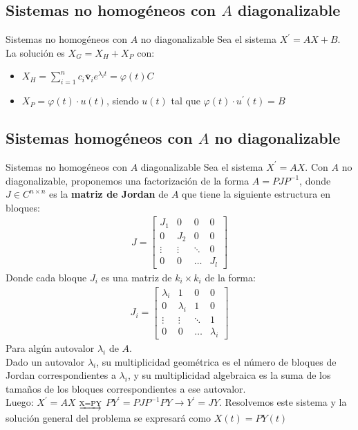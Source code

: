 \documentclass[a4paper, twoside]{article}
\numberwithin{equation}{section}
\numberwithin{figure}{section}
\numberwithin{table}{section}
\newcommand{\vect}[1]{\overline{\textbf{#1}}}
\begin{document}
\subsection{Sistemas no homogéneos con $A$ diagonalizable}
\begin{definicion*}{Sistemas no homogéneos con $A$ no diagonalizable}
	Sea el sistema $X^\prime=AX+B$. La solución es $X_G=X_H+X_P$ con:
	\begin{itemize}
		\item $X_H=\sum_{i=1}^n c_i \vect{v}_i e^{\lambda_i t}=\varphi (t) C$
		\item $X_P=\varphi (t) \cdot u(t)$, siendo $u(t)$ tal que $\varphi (t) \cdot u^\prime(t)=B$
	\end{itemize}
\end{definicion*}

\subsection{Sistemas homogéneos con $A$ no diagonalizable}
\begin{definicion*}{Sistemas no homogéneos con $A$ diagonalizable}
	Sea el sistema $X^\prime=AX$. Con $A$ no diagonalizable, proponemos una factorización de la forma $A=PJP^{-1}$, donde $J \in C^{n \times n}$ es la \textbf{matriz de Jordan} de $A$ que tiene la siguiente estructura en bloques:
	\begin{align}
		J = \begin{bmatrix}
				{J_1} & {0} & {0} & {0} \\
				{0} & {J_2} & {0} & {0} \\
				{\vdots} & {\vdots} & {\ddots} & {0} \\
				{0} & {0} & {\ldots} & {J_l}
			\end{bmatrix}
	\end{align}
	Donde cada bloque $J_i$ es una matriz de $k_i \times k_i$ de la forma:
	\begin{align}
		J_i=\begin{bmatrix} {\lambda_i}&{1}&{0}&{0} \\ {0}&{\lambda_i}&{1}&{0} \\ {\vdots}&{\vdots}&{\ddots}&{1} \\ {0}&{0}&{\ldots}&{\lambda_i} \end{bmatrix}
	\end{align}
	Para algún autovalor $\lambda_i$ de $A$.\\
	
	Dado un autovalor $\lambda_i$, su multiplicidad geométrica es el número de bloques de Jordan correspondientes a $\lambda_i$, y su multiplicidad algebraica es la suma de los tamaños de los bloques correspondientes a ese autovalor.\\
	
	Luego: $X^\prime=AX$ $\underrightarrow{\text{{\scriptsize X=PY}}}$ $P Y^\prime=PJP^{-1}PY \longrightarrow Y^\prime=JY$. Resolvemos este sistema y la solución general del problema se expresará como $X(t)=P Y(t)$
\end{definicion*}
\end{document}
